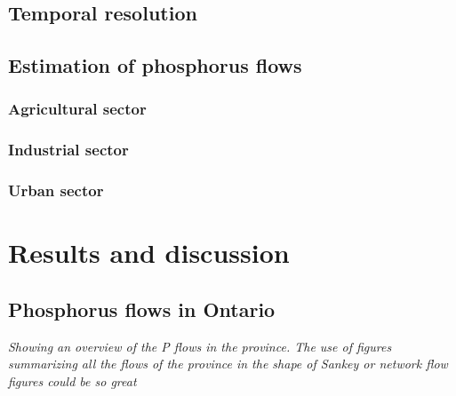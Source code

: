 \documentclass[authoryear]{elsarticle}
\begin{document}
\subsection{Temporal resolution}

\subsection{Estimation of phosphorus flows}

\subsubsection{Agricultural sector}

\subsubsection{Industrial sector}

\subsubsection{Urban sector}

\section{Results and discussion}
\subsection{Phosphorus flows in Ontario}
\emph{\color{red}Showing an overview of the P flows in the province. The use of figures summarizing all the flows of the province in the shape of Sankey or network flow figures could be so great}
\end{document}

